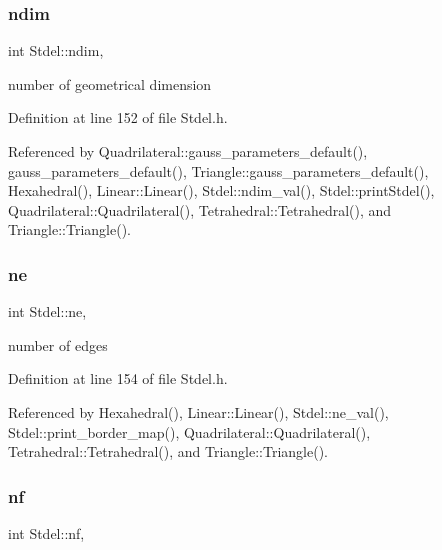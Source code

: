 \mbox{\label{classStdel_a912f36b591d847eed2531a3b3a51a520}} 
\subsubsection{\texorpdfstring{ndim}{ndim}}
{\footnotesize\ttfamily int Stdel\+::ndim\hspace{0.3cm}{\ttfamily [protected]}, {\ttfamily [inherited]}}



number of geometrical dimension 



Definition at line 152 of file Stdel.\+h.



Referenced by Quadrilateral\+::gauss\+\_\+parameters\+\_\+default(), gauss\+\_\+parameters\+\_\+default(), Triangle\+::gauss\+\_\+parameters\+\_\+default(), Hexahedral(), Linear\+::\+Linear(), Stdel\+::ndim\+\_\+val(), Stdel\+::print\+Stdel(), Quadrilateral\+::\+Quadrilateral(), Tetrahedral\+::\+Tetrahedral(), and Triangle\+::\+Triangle().

\mbox{\label{classStdel_aef3d1b34184b9fd03c0b655640c243b6}} 
\subsubsection{\texorpdfstring{ne}{ne}}
{\footnotesize\ttfamily int Stdel\+::ne\hspace{0.3cm}{\ttfamily [protected]}, {\ttfamily [inherited]}}



number of edges 



Definition at line 154 of file Stdel.\+h.



Referenced by Hexahedral(), Linear\+::\+Linear(), Stdel\+::ne\+\_\+val(), Stdel\+::print\+\_\+border\+\_\+map(), Quadrilateral\+::\+Quadrilateral(), Tetrahedral\+::\+Tetrahedral(), and Triangle\+::\+Triangle().

\mbox{\label{classStdel_a61987080026986a40412a8937aad4b24}} 
\subsubsection{\texorpdfstring{nf}{nf}}
{\footnotesize\ttfamily int Stdel\+::nf\hspace{0.3cm}{\ttfamily [protected]}, {\ttfamily [inherited]}}



